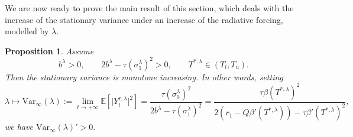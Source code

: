 \documentclass[10pt]{amsart}
\newtheorem{proposition}[theorem]{Proposition}
\numberwithin{equation}{section}
\begin{document}
We are now ready to prove the main result of this section, which deals with the increase of the stationary variance under an increase of the radiative forcing, modelled by $\lambda$.
\begin{proposition} \label{prop: variance derivative}
Assume 
    $$
    b^\lambda >0,  \qquad  2b^\lambda - \tau (\sigma_1^\lambda )^2 >0, \qquad T^{*,\lambda} \in (T_l, T_u).
    $$
    Then the stationary variance is monotone increasing. In other words, setting
$$
\lambda \mapsto \mathrm{Var}_\infty (\lambda):= \lim \limits_{ t \to +\infty  } \mathbb{E}[ \vert Y_t^{\tau,\lambda} \vert ^2] = \frac{\tau (\sigma_0^\lambda )^2}{ 2 b^\lambda - \tau (\sigma_1^\lambda)^2} = \frac{\tau \beta(T^{*,\lambda})^2 }{2 (r_1 - Q \beta'(T^{*,\lambda})) - \tau \beta'( T^{*,\lambda})^2},
$$
we have $\mathrm{Var}_\infty (\lambda) ' >0.$
\end{proposition}
\end{document}
